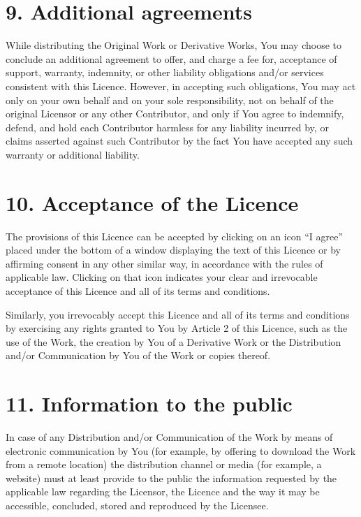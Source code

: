 \documentclass[letterpaper,10pt,english]{sphinxmanual}
\begin{document}
\section{9. Additional agreements}
\label{license:additional-agreements}
While distributing the Original Work or Derivative Works, You may choose to
conclude an additional agreement to offer, and charge a fee for, acceptance of support,
warranty, indemnity, or other liability obligations and/or services consistent with this
Licence. However, in accepting such obligations, You may act only on your own
behalf and on your sole responsibility, not on behalf of the original Licensor or any
other Contributor, and only if You agree to indemnify, defend, and hold each
Contributor harmless for any liability incurred by, or claims asserted against such
Contributor by the fact You have accepted any such warranty or additional liability.


\section{10. Acceptance of the Licence}
\label{license:acceptance-of-the-licence}
The provisions of this Licence can be accepted by clicking on an icon “I agree”
placed under the bottom of a window displaying the text of this Licence or by
affirming consent in any other similar way, in accordance with the rules of applicable
law. Clicking on that icon indicates your clear and irrevocable acceptance of this
Licence and all of its terms and conditions.

Similarly, you irrevocably accept this Licence and all of its terms and conditions by
exercising any rights granted to You by Article 2 of this Licence, such as the use of
the Work, the creation by You of a Derivative Work or the Distribution and/or
Communication by You of the Work or copies thereof.


\section{11. Information to the public}
\label{license:information-to-the-public}
In case of any Distribution and/or Communication of the Work by means of electronic
communication by You (for example, by offering to download the Work from a
remote location) the distribution channel or media (for example, a website) must at
least provide to the public the information requested by the applicable law regarding
the Licensor, the Licence and the way it may be accessible, concluded, stored and
reproduced by the Licensee.
\end{document}
